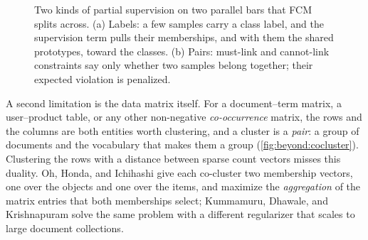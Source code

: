 \begin{figure}[htbp]
\caption[Two kinds of partial supervision.]{Two kinds of partial supervision on two parallel bars that FCM splits across. (a) Labels: a few samples carry a class label, and the supervision term pulls their memberships, and with them the shared prototypes, toward the classes. (b) Pairs: must-link and cannot-link constraints say only whether two samples belong together; their expected violation is penalized.}
\label{fig:beyond:supervision}
\end{figure}

A second limitation is the data matrix itself. For a document--term matrix, a user--product table, or any other non-negative \emph{co-occurrence} matrix, the rows and the columns are both entities worth clustering, and a cluster is a \emph{pair}: a group of documents and the vocabulary that makes them a group (\cref{fig:beyond:cocluster}). Clustering the rows with a distance between sparse count vectors misses this duality. Oh, Honda, and Ichihashi \cite{oh:2001:fccm} give each co-cluster two membership vectors, one over the objects and one over the items, and maximize the \emph{aggregation} of the matrix entries that both memberships select; Kummamuru, Dhawale, and Krishnapuram \cite{kummamuru:2003:codok} solve the same problem with a different regularizer that scales to large document collections.

